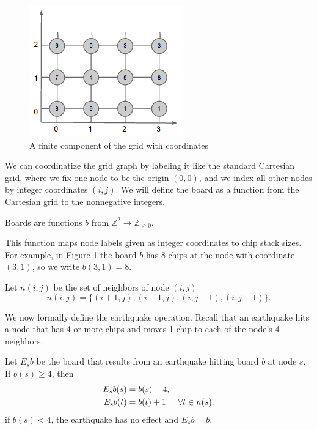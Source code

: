 \documentclass[runningheads,a4paper]{llncs}
\begin{document}
\begin{figure}
\label{cartesiangrid}
\begin{center}
\includegraphics[scale=0.8]{cartesiangrid.png}
\end{center}
\caption{A finite component of the grid with coordinates}
\end{figure}
We can coordinatize the grid graph by labeling it like the standard Cartesian grid, where we fix one node to be the origin $(0,0)$, and we index all other nodes by integer coordinates $(i,j)$. We will define the board as a function from the Cartesian grid to the nonnegative integers.

\begin{definition} Boards are functions $b$ from $\mathbb{Z}^2 \to \mathbb{Z}_{\geq 0}$.
\end{definition}

This function maps node labels given as integer coordinates to chip stack sizes. For example, in Figure \ref{cartesiangrid} the board $b$ has 8 chips at the node with coordinate $(3,1)$, so we write $b(3,1) = 8$.

\begin{definition} Let $n(i,j)$ be the set of neighbors of node $(i,j)$
\begin{equation*}
n(i,j) = \{ (i+1, j), (i-1, j), (i, j-1), (i, j+1) \}.
\end{equation*}
\end{definition}

We now formally define the earthquake operation. Recall that an earthquake hits a node that has 4 or more chips and moves 1 chip to each of the node's 4 neighbors. 

\begin{definition}
Let $E_sb$ be the board that results from an earthquake hitting board $b$ at node $s$. If $b(s) \geq 4$, then
\begin{align*}
E_sb(s) &= b(s)-4,\\
E_sb(t) &= b(t)+1 \hspace{.5cm} \forall t \in n(s).\\
\end{align*}
if $b(s) < 4$, the earthquake has no effect and $E_sb = b$. 
\end{definition}
\end{document}
